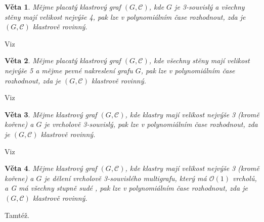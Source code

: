 \documentclass[12pt,a4report]{report}
\newtheorem{theorem}{Věta}[chapter]
\theoremstyle{definition}
\begin{document}
\begin{theorem}
Mějme placatý klastrový graf  $(G, \mathcal C)$, kde $G$ je 3-souvislý a všechny stěny mají velikost nejvýše 4, pak lze v polynomiálním čase rozhodnout, zda je  $(G, \mathcal C)$ klastrově rovinný.
\end{theorem}

Viz \cite{JelinkovaEtAl07}

\begin{theorem}
Mějme placatý klastrový graf  $(G, \mathcal C)$, kde všechny stěny mají velikost nejvýše 5 a mějme pevné nakreslení grafu $G$, pak lze v polynomiálním čase rozhodnout, zda je  $(G, \mathcal C)$ klastrově rovinný.
\end{theorem}

Viz \cite{DiBattistaFrati07}

\begin{theorem}
Mějme klastrový graf $(G, \mathcal C)$, kde klastry mají velikost nejvýše 3 (kromě kořene) a $G$ je vrcholově 3-souvislý, pak lze v polynomiálním čase rozhodnout, zda je  $(G, \mathcal C)$ klastrově rovinný. 
\end{theorem}

Viz \cite{JelinkovaEtAl07}

\begin{theorem}
Mějme klastrový graf $(G, \mathcal C)$, kde klastry mají velikost nejvýše 3 (kromě kořene) a $G$ je dělení vrcholově 3-souvislého multigrafu, který má $\mathcal O(1)$ vrcholů, a G má všechny stupně sudé , pak lze v polynomiálním čase rozhodnout, zda je  $(G, \mathcal C)$ klastrově rovinný. 
\end{theorem}

Tamtéž.

\end{document}
